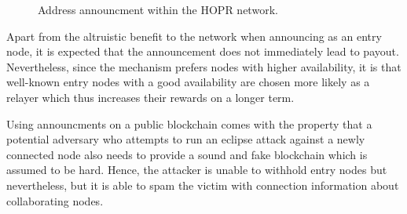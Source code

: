 \begin{figure}[H]
    \caption{Address announcment within the HOPR network.}
    \label{fig:address-announcement}
\end{figure}

Apart from the altruistic benefit to the network when announcing as an entry node, it is expected that the announcement does not immediately lead to payout. Nevertheless, since the  mechanism prefers nodes with higher availability, it is that well-known entry nodes with a good availability are chosen more likely as a relayer which thus increases their rewards on a longer term.

Using announcments on a public blockchain comes with the property that a potential adversary who attempts to run an eclipse attack against a newly connected node also needs to provide a sound and fake blockchain which is assumed to be hard. Hence, the attacker is unable to withhold entry nodes but nevertheless, but it is able to spam the victim with connection information about collaborating nodes.